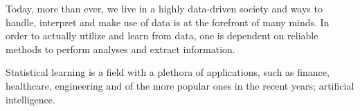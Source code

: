 




Today, more than ever, we live in a highly data-driven society and ways to handle, interpret and make use of data is at the forefront of many minds. 
In order to actually utilize and learn from data, one is dependent on reliable methods to perform analyses and extract information. 

Statistical learning is a field with a plethora of applications, such as finance, healthcare, engineering and of the more popular ones in the recent years; artificial intelligence. 



